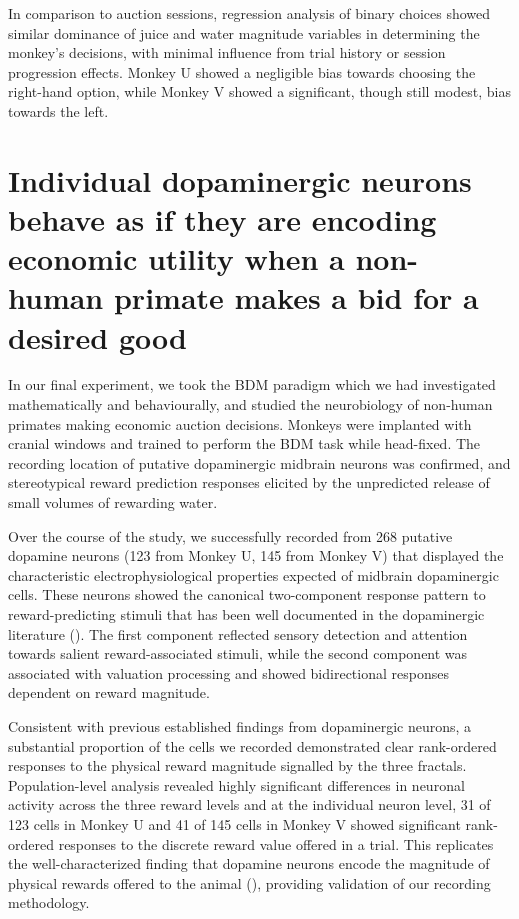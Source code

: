 In comparison to auction sessions, regression analysis of binary choices showed similar dominance of juice and water magnitude variables in determining the monkey's decisions, with minimal influence from trial history or session progression effects. Monkey U showed a negligible bias towards choosing the right-hand option, while Monkey V showed a significant, though still modest, bias towards the left.

\clearpage
\section{Individual dopaminergic neurons behave as if they are encoding economic utility when a non-human primate makes a bid for a desired good}

In our final experiment, we took the BDM paradigm which we had investigated mathematically and behaviourally, and studied the neurobiology of non-human primates making economic auction decisions. Monkeys were implanted with cranial windows and trained to perform the BDM task while head-fixed. The recording location of putative dopaminergic midbrain neurons was confirmed, and stereotypical reward prediction responses elicited by the unpredicted release of small volumes of rewarding water.

Over the course of the study, we successfully recorded from 268 putative dopamine neurons (123 from Monkey U, 145 from Monkey V) that displayed the characteristic electrophysiological properties expected of midbrain dopaminergic cells. These neurons showed the canonical two-component response pattern to reward-predicting stimuli that has been well documented in the dopaminergic literature (\cite{schultzDopamineRewardPredictionerror2016}). The first component reflected sensory detection and attention towards salient reward-associated stimuli, while the second component was associated with valuation processing and showed bidirectional responses dependent on reward magnitude.

Consistent with previous established findings from dopaminergic neurons, a substantial proportion of the cells we recorded demonstrated clear rank-ordered responses to the physical reward magnitude signalled by the three fractals. Population-level analysis revealed highly significant differences in neuronal activity across the three reward levels and at the individual neuron level, 31 of 123 cells in Monkey U and 41 of 145 cells in Monkey V showed significant rank-ordered responses to the discrete reward value offered in a trial. This replicates the well-characterized finding that dopamine neurons encode the magnitude of physical rewards offered to the animal (\cite{toblerAdaptiveCodingReward2005, fiorilloDiscreteCodingReward2003}), providing validation of our recording methodology.

